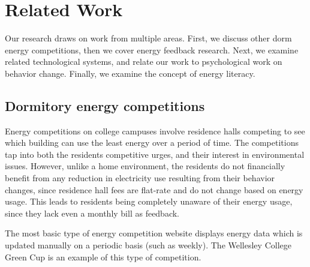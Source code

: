
\section{Related Work}
\label{sec:related-work}

Our research draws on work from multiple areas. First, we discuss other dorm energy competitions, then we cover energy feedback research. Next, we examine related technological systems, and relate our work to psychological work on behavior change. Finally, we examine the concept of energy literacy.

\subsection{Dormitory energy competitions}

Energy competitions on college campuses involve residence halls competing to see which building can use the least energy over a period of time. The competitions tap into both the residents competitive urges, and their interest in environmental issues. However, unlike a home environment, the residents do not financially benefit from any reduction in electricity use resulting from their behavior changes, since residence hall fees are flat-rate and do not change based on energy usage. This leads to residents being completely unaware of their energy usage, since they lack even a monthly bill as feedback.

The most basic type of energy competition website displays energy data which is updated manually on a periodic basis (such as weekly). The Wellesley College Green Cup \cite{wellesley-green-cup} is an example of this type of competition. 

